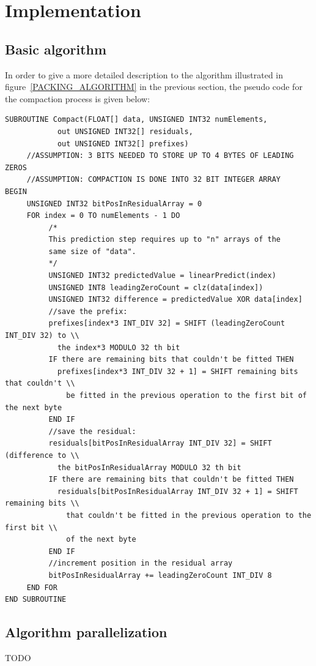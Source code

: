 \section{Implementation}
 \subsection{Basic algorithm}
  In order to give a more detailed description to the algorithm illustrated in figure~\ref{PACKING_ALGORITHM} in the previous section, the pseudo code for the compaction
  process is given below:
\begin{verbatim}
SUBROUTINE Compact(FLOAT[] data, UNSIGNED INT32 numElements, 
		    out UNSIGNED INT32[] residuals, 
		    out UNSIGNED INT32[] prefixes)
	 //ASSUMPTION: 3 BITS NEEDED TO STORE UP TO 4 BYTES OF LEADING ZEROS
	 //ASSUMPTION: COMPACTION IS DONE INTO 32 BIT INTEGER ARRAY
BEGIN
	 UNSIGNED INT32 bitPosInResidualArray = 0
	 FOR index = 0 TO numElements - 1 DO
		  /*
		  This prediction step requires up to "n" arrays of the 
		  same size of "data".
		  */
		  UNSIGNED INT32 predictedValue = linearPredict(index) 
		  UNSIGNED INT8 leadingZeroCount = clz(data[index])
		  UNSIGNED INT32 difference = predictedValue XOR data[index]
		  //save the prefix:
		  prefixes[index*3 INT_DIV 32] = SHIFT (leadingZeroCount INT_DIV 32) to \\
		    the index*3 MODULO 32 th bit
		  IF there are remaining bits that couldn't be fitted THEN
		    prefixes[index*3 INT_DIV 32 + 1] = SHIFT remaining bits that couldn't \\
		      be fitted in the previous operation to the first bit of the next byte
		  END IF
		  //save the residual:
		  residuals[bitPosInResidualArray INT_DIV 32] = SHIFT (difference to \\
		    the bitPosInResidualArray MODULO 32 th bit
		  IF there are remaining bits that couldn't be fitted THEN
		    residuals[bitPosInResidualArray INT_DIV 32 + 1] = SHIFT remaining bits \\
		      that couldn't be fitted in the previous operation to the first bit \\
		      of the next byte
		  END IF  
		  //increment position in the residual array
		  bitPosInResidualArray += leadingZeroCount INT_DIV 8
	 END FOR
END SUBROUTINE
\end{verbatim}
 \subsection{Algorithm parallelization}
  {\color{red}TODO}

